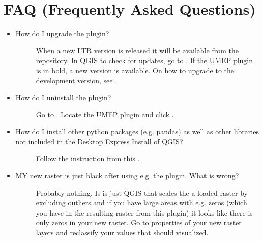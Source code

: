\documentclass[letterpaper,10pt,english]{sphinxmanual}
\begin{document}
\chapter{FAQ (Frequently Asked Questions)}
\label{\detokenize{FAQ:faq-frequently-asked-questions}}\label{\detokenize{FAQ:faq}}\label{\detokenize{FAQ::doc}}\begin{itemize}
\item {} \begin{description}
\item[{How do I upgrade the plugin?}] \leavevmode
When a new LTR version is released it will be available from the repository. In QGIS to check for updates, go to . If the UMEP plugin is in bold, a new version is available. On how to upgrade to the development version, see {\hyperref[\detokenize{Getting_Started::doc}]{}}.

\end{description}

\item {} \begin{description}
\item[{How do I uninstall the plugin?}] \leavevmode
Go to . Locate the UMEP plugin and click .

\end{description}

\item {} \begin{description}
\item[{How do I install other python packages (e.g. pandas) as well as other libraries not included in the Desktop Express Install of QGIS?}] \leavevmode
Follow the instruction from this {\hyperref[\detokenize{Getting_Started:python-libraries}]{}}.

\end{description}

\item {} \begin{description}
\item[{MY new raster is just black after using e.g. the  plugin. What is wrong?}] \leavevmode
Probably nothing. Is is just QGIS that scales the a loaded raster by excluding outliers and if you have large areas with e.g. zeros (which you have in the resulting raster from this plugin) it looks like there is only zeros in your new raster. Go to properties of your new raster layers and reclassify your values that should visualized.


\end{description}
\end{itemize}
\end{document}
